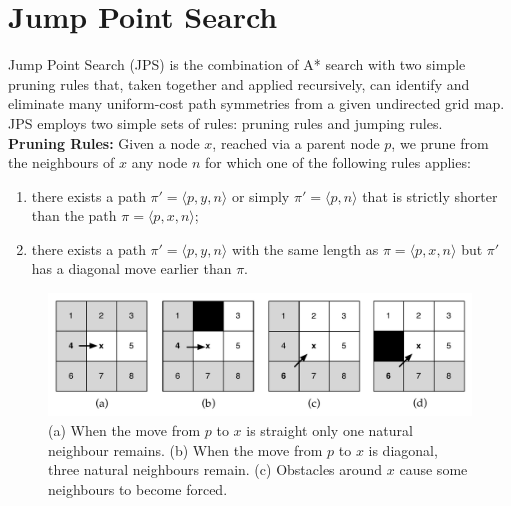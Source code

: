 \section{Jump Point Search}
Jump Point Search (JPS) is the combination of A* search with two simple pruning rules
that, taken together and applied recursively, can identify and eliminate many 
uniform-cost path symmetries from a given undirected grid map. 
JPS employs two simple sets of rules: pruning rules and jumping rules. 
\\ \newline
\textbf{Pruning Rules:}
Given a node $x$, reached via a parent node $p$,
we prune from the neighbours of $x$ any node $n$ for which one 
of the following rules applies:
\begin{enumerate}
\item 
  there exists a path $\pi' = \langle p,y,n \rangle$ or simply $\pi' = \langle p, n \rangle$
  that is strictly shorter than the path $\pi = \langle p,x,n \rangle$; 
\item 
  there exists a path $\pi' = \langle p,y,n \rangle$ 
  with the same length as $\pi = \langle p,x,n \rangle$ but $\pi'$ has a 
  diagonal move earlier than $\pi$.  
\end{enumerate}

\begin{figure}[tb]
       \begin{center}
		   \includegraphics[width=0.95\columnwidth]
			{diagrams/pruningrules.pdf}
       \end{center}
	\vspace{-3pt}
       \caption{(a) When the move from $p$ to $x$ is straight only one natural neighbour remains.
(b) When the move from $p$ to $x$ is diagonal, three natural neighbours remain. (c) Obstacles around $x$
cause some neighbours to become forced. }
       \label{fig:pruning}
\end{figure}

